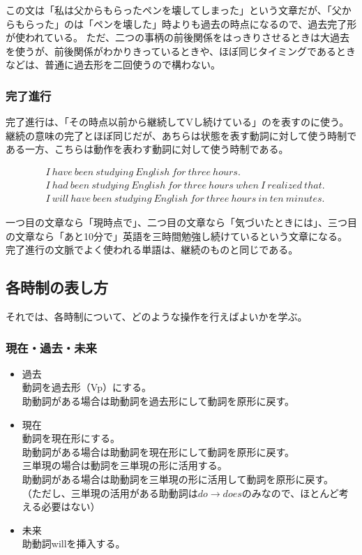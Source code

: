 この文は「私は父からもらったペンを壊してしまった」という文章だが、「父からもらった」のは「ペンを壊した」時よりも過去の時点になるので、過去完了形が使われている。
ただ、二つの事柄の前後関係をはっきりさせるときは大過去を使うが、前後関係がわかりきっているときや、ほぼ同じタイミングであるときなどは、普通に過去形を二回使うので構わない。

\subsubsection{完了進行}

完了進行は、「その時点以前から継続してVし続けている」のを表すのに使う。
継続の意味の完了とほぼ同じだが、あちらは状態を表す動詞に対して使う時制である一方、こちらは動作を表わす動詞に対して使う時制である。

\begin{align}
  &I ~ have ~ been ~ studying ~ English ~ for ~ three ~ hours \text{.}\\
  &I ~ had ~ been ~ studying ~ English ~ for ~ three ~ hours ~ when ~ I ~ realized ~ that \text{.}\\
  &I ~ will ~ have ~ been ~ studying ~ English ~ for ~ three ~ hours ~ in ~ ten ~ minutes \text{.}
\end{align}

一つ目の文章なら「現時点で」、二つ目の文章なら「気づいたときには」、三つ目の文章なら「あと10分で」英語を三時間勉強し続けているという文章になる。
完了進行の文脈でよく使われる単語は、継続のものと同じである。

\subsection{各時制の表し方}

それでは、各時制について、どのような操作を行えばよいかを学ぶ。

\subsubsection{現在・過去・未来}

\begin{itemize}
  \item 過去\\
  動詞を過去形（Vp）にする。\\
  助動詞がある場合は助動詞を過去形にして動詞を原形に戻す。
  \item 現在\\
  動詞を現在形にする。\\
  助動詞がある場合は助動詞を現在形にして動詞を原形に戻す。\\
  三単現の場合は動詞を三単現の形に活用する。\\
  助動詞がある場合は助動詞を三単現の形に活用して動詞を原形に戻す。\\
  （ただし、三単現の活用がある助動詞は$do \rightarrow does$のみなので、ほとんど考える必要はない）
  \item 未来\\
  助動詞willを挿入する。
\end{itemize}

